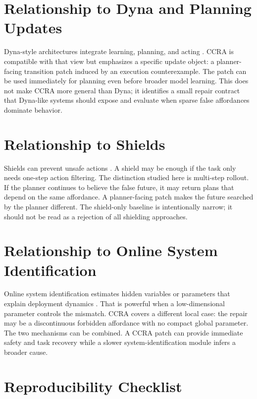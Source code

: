 \documentclass{article}
\begin{document}
\section{Relationship to Dyna and Planning Updates}

Dyna-style architectures integrate learning, planning, and acting \citep{sutton1991dyna}. CCRA is compatible with that view but emphasizes a specific update object: a planner-facing transition patch induced by an execution counterexample. The patch can be used immediately for planning even before broader model learning. This does not make CCRA more general than Dyna; it identifies a small repair contract that Dyna-like systems should expose and evaluate when sparse false affordances dominate behavior.

\section{Relationship to Shields}

Shields can prevent unsafe actions \citep{alshiekh2018shielding}. A shield may be enough if the task only needs one-step action filtering. The distinction studied here is multi-step rollout. If the planner continues to believe the false future, it may return plans that depend on the same affordance. A planner-facing patch makes the future searched by the planner different. The shield-only baseline is intentionally narrow; it should not be read as a rejection of all shielding approaches.

\section{Relationship to Online System Identification}

Online system identification estimates hidden variables or parameters that explain deployment dynamics \citep{yu2017uposi}. That is powerful when a low-dimensional parameter controls the mismatch. CCRA covers a different local case: the repair may be a discontinuous forbidden affordance with no compact global parameter. The two mechanisms can be combined. A CCRA patch can provide immediate safety and task recovery while a slower system-identification module infers a broader cause.

\section{Reproducibility Checklist}
\end{document}
